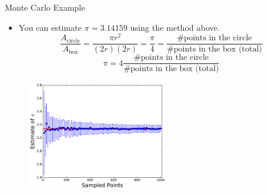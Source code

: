 \documentclass{beamer}
\begin{document}
\begin{frame}{Monte Carlo Example}
\begin{itemize}
   \item You can estimate $\pi=3.14159$ using the method above.
\begin{equation*}
   \frac{A_\text{circle}}{A_\text{box}} = \frac{\pi r^2}{(2r)(2r)} = \frac{\pi}{4} = \frac{\text{\# points in the circle}}{\text{\# points in the box (total)}}
\end{equation*}
\begin{equation*}
   \pi=4\frac{\text{\# points in the circle}}{\text{\# points in the box (total)}}
\end{equation*}
\end{itemize}
\begin{figure}[h]
   \includegraphics[width=0.55\textwidth]{figures/pi_estimate.pdf}
\end{figure}
\end{frame}
\end{document}
